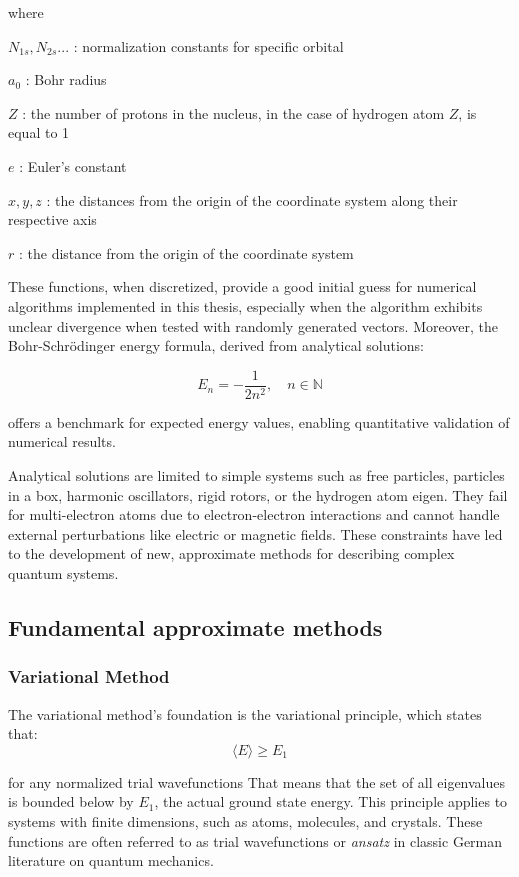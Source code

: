 \noindent where

\(N_{1s}, N_{2s}... \) : normalization constants for specific orbital

\(a_0 \) : Bohr radius

\(Z \) : the number of protons in the nucleus, in the case of hydrogen atom $Z$, is equal to 1

\(e \) : Euler's constant

\(x,y,z \) : the distances from the origin of the coordinate system along their respective axis

\(r \) : the distance from the origin of the coordinate system

These functions, when discretized, provide a good initial guess for numerical algorithms implemented in this thesis, especially when the algorithm exhibits unclear divergence when tested with randomly generated vectors. Moreover, the Bohr-Schrödinger energy formula, derived from analytical solutions:

\begin{equation}
	E_n = -\frac{1}{2n^2}, \quad n \in \mathbb{N}
\end{equation}

\noindent offers a benchmark for expected energy values, enabling quantitative validation of numerical results.

Analytical solutions are limited to simple systems such as free particles, particles in a box, harmonic oscillators, rigid rotors, or the hydrogen atom eigen. They fail for multi-electron atoms due to electron-electron interactions and cannot handle external perturbations like electric or magnetic fields. These constraints have led to the development of new, approximate methods for describing complex quantum systems.
\subsection{Fundamental approximate methods}
\subsubsection{Variational Method}
The variational method's foundation is the variational principle, which states that:
\begin{equation}
	\langle E \rangle \geqslant E_1
\end{equation}

\noindent for any normalized trial wavefunctions That means that the set of all eigenvalues is bounded below by $E_1$, the actual ground state energy. This principle applies to systems with finite dimensions, such as atoms, molecules, and crystals. These functions are often referred to as trial wavefunctions or \textit{ansatz} in classic German literature on quantum mechanics.


